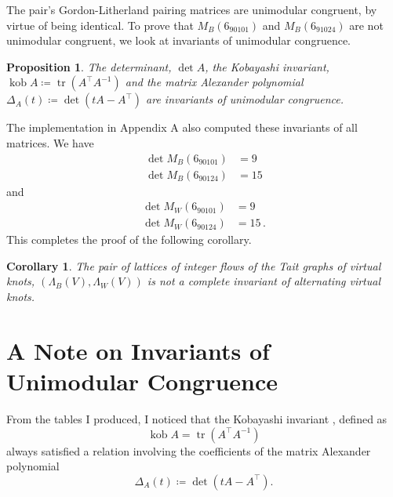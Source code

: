 \documentclass[12pt]{report}
\newcommand{\kob}{\operatorname{kob}}
\newtheorem*{proposition}{Proposition}
\newtheorem*{corollary}{Corollary}
\theoremstyle{upright}
\begin{document}
The pair's Gordon-Litherland pairing matrices are unimodular congruent, by virtue of being identical. To prove that $M_{B}(6_{90101})$ and $M_{B}(6_{91024})$ are not unimodular congruent, we look at invariants of unimodular congruence.

\begin{proposition}
	The determinant, $\det A$, the Kobayashi invariant, $\kob A \coloneq \operatorname{tr}(A^{\top}A^{-1})$ \cite{new-invariant-under-congruence} and the matrix Alexander polynomial $\Delta_{A}(t) \coloneq \det(tA - A^{\top})$ \cite{mock-seifert-matrices} are invariants of unimodular congruence.
\end{proposition}

The implementation in Appendix A also computed these invariants of all matrices. We have
\begin{align*}
	\det M_{B}(6_{90101}) & = 9  \\
	\det M_{B}(6_{90124}) & = 15
\end{align*}
and
\begin{align*}
	\det M_{W}(6_{90101}) & = 9  \\
	\det M_{W}(6_{90124}) & = 15 \,.
\end{align*}
This completes the proof of the following corollary.

\begin{corollary}
	The pair of lattices of integer flows of the Tait graphs of virtual knots, $(\Lambda_{B}(V), \Lambda_{W}(V))$ is not a complete invariant of alternating virtual knots.
\end{corollary}



\section{A Note on Invariants of Unimodular Congruence}

From the tables I produced, I noticed that the Kobayashi invariant \cite{new-invariant-under-congruence}, defined as
\[\kob A = \operatorname{tr}(A^{\top}A^{-1})\]
always satisfied a relation involving the coefficients of the matrix Alexander polynomial \cite{mock-seifert-matrices}
\[\Delta_{A}(t) \coloneq \det(tA - A^{\top}).\]
\end{document}
